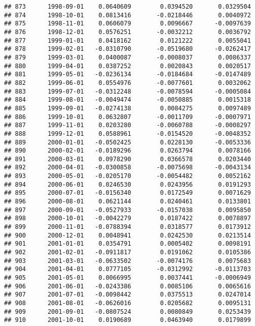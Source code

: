 \documentclass[
]{article}
\begin{document}
\begin{verbatim}
## 873      1998-09-01    0.0640609        0.0394520       0.0329504
## 874      1998-10-01    0.0813416       -0.0218446       0.0040972
## 875      1998-11-01    0.0606079        0.0096667      -0.0097639
## 876      1998-12-01    0.0576251       -0.0032212       0.0036792
## 877      1999-01-01    0.0418162        0.0121222       0.0055041
## 878      1999-02-01   -0.0310790       -0.0519680      -0.0262417
## 879      1999-03-01    0.0400087       -0.0008037       0.0086337
## 880      1999-04-01    0.0387252        0.0020843       0.0020517
## 881      1999-05-01   -0.0236134       -0.0184684      -0.0147489
## 882      1999-06-01    0.0554976       -0.0077601       0.0032062
## 883      1999-07-01   -0.0312248       -0.0078594      -0.0005084
## 884      1999-08-01   -0.0049474       -0.0050885       0.0015318
## 885      1999-09-01   -0.0274138        0.0084275       0.0097489
## 886      1999-10-01    0.0632807       -0.0011709      -0.0007971
## 887      1999-11-01    0.0203280       -0.0060788      -0.0008297
## 888      1999-12-01    0.0588961       -0.0154520      -0.0048352
## 889      2000-01-01   -0.0502425        0.0228130      -0.0053336
## 890      2000-02-01   -0.0189296        0.0263794       0.0078166
## 891      2000-03-01    0.0978290        0.0366578       0.0203440
## 892      2000-04-01   -0.0300858       -0.0075698      -0.0043134
## 893      2000-05-01   -0.0205170       -0.0054482       0.0052162
## 894      2000-06-01    0.0246530        0.0243956       0.0191293
## 895      2000-07-01   -0.0156340        0.0172549       0.0071629
## 896      2000-08-01    0.0621144        0.0240461       0.0133801
## 897      2000-09-01   -0.0527933       -0.0157038       0.0095850
## 898      2000-10-01   -0.0042279        0.0187422       0.0078897
## 899      2000-11-01   -0.0788394        0.0318577       0.0173912
## 900      2000-12-01    0.0048941        0.0242530       0.0213514
## 901      2001-01-01    0.0354791        0.0005402       0.0098191
## 902      2001-02-01   -0.0911817        0.0191062       0.0105386
## 903      2001-03-01   -0.0633502       -0.0074176       0.0075683
## 904      2001-04-01    0.0777105       -0.0312992      -0.0113703
## 905      2001-05-01    0.0066995        0.0037441      -0.0006949
## 906      2001-06-01   -0.0243386        0.0085106       0.0065616
## 907      2001-07-01   -0.0098442        0.0375513       0.0247014
## 908      2001-08-01   -0.0626016        0.0205682       0.0095131
## 909      2001-09-01   -0.0807524        0.0080849       0.0253439
## 910      2001-10-01    0.0190689        0.0463940       0.0179899

\end{verbatim}
\end{document}
